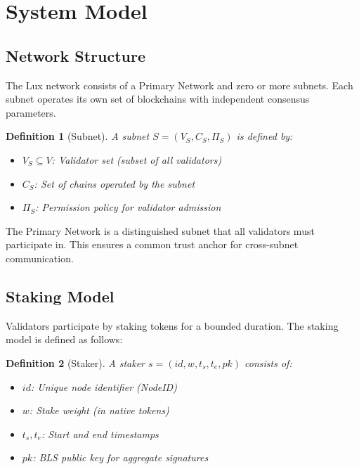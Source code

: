\documentclass[11pt,letterpaper]{article}
\newtheorem{definition}{Definition}
\begin{document}
\section{System Model}

\subsection{Network Structure}

The Lux network consists of a Primary Network and zero or more subnets. Each subnet operates its own set of blockchains with independent consensus parameters.

\begin{definition}[Subnet]
A subnet $S = (V_S, C_S, \Pi_S)$ is defined by:
\begin{itemize}
    \item $V_S \subseteq V$: Validator set (subset of all validators)
    \item $C_S$: Set of chains operated by the subnet
    \item $\Pi_S$: Permission policy for validator admission
\end{itemize}
\end{definition}

The Primary Network is a distinguished subnet that all validators must participate in. This ensures a common trust anchor for cross-subnet communication.

\subsection{Staking Model}

Validators participate by staking tokens for a bounded duration. The staking model is defined as follows:

\begin{definition}[Staker]
A staker $s = (id, w, t_s, t_e, pk)$ consists of:
\begin{itemize}
    \item $id$: Unique node identifier (NodeID)
    \item $w$: Stake weight (in native tokens)
    \item $t_s, t_e$: Start and end timestamps
    \item $pk$: BLS public key for aggregate signatures
\end{itemize}
\end{definition}
\end{document}
